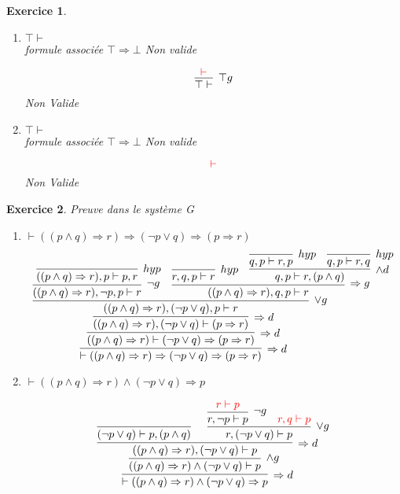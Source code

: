 \documentclass{article}
\theoremstyle{plain}
\newtheorem{exo}{Exercice}%
\begin{document}
\begin{exo}
\begin{enumerate}
        \[
            \infer[\bot g]{p, \bot \vdash}{}
        \]
        Valide

    \item $\top \vdash$\\
        formule associée $\top \Rightarrow \bot$ Non valide

        \[
            \infer[\top g]{\top \vdash}{\textcolor{red}{\vdash}}
        \]
        Non Valide

    \item $\top \vdash$\\
        formule associée $\top \Rightarrow \bot$ Non valide

        \[ \textcolor{red}{\vdash}\]
        Non Valide
\end{enumerate}
\end{exo}

\begin{exo} Preuve dans le système G
\begin{enumerate}
    \item  $\vdash ((p \wedge q) \Rightarrow r) \Rightarrow
                    (\neg p \vee q) \Rightarrow (p \Rightarrow r)$
    \[
        \infer[\Rightarrow d]{\vdash ((p \wedge q) \Rightarrow r) \Rightarrow
                (\neg p \vee q) \Rightarrow (p \Rightarrow r)}
        {
            \infer[\Rightarrow d]{((p \land q) \Rightarrow r) \vdash (\neg p \vee q)
                \Rightarrow (p \Rightarrow r)}
                {
                \infer[\Rightarrow d]
                {((p \land q) \Rightarrow r), (\neg p \vee q) \vdash (p \Rightarrow r)}
                {
                {
                \infer[\vee g]{((p \land q) \Rightarrow r), (\neg p \vee q), p
                \vdash r}{
                \infer[\neg g]{((p \land q) \Rightarrow r), \neg p, p \vdash r}
                {\infer[hyp]{((p \land q) \Rightarrow r), p \vdash p, r}{}}
                &
                \infer[\Rightarrow g]{((p \land q) \Rightarrow r), q, p \vdash r}
                {
                \infer[hyp]{r, q, p \vdash r}{}
                &
                \infer[\land d]{q, p \vdash r, (p \land q)}
                {
                \infer[hyp]{q, p \vdash r, p}{}
                &
                \infer[hyp]{q, p \vdash r, q}{}
                }
                }}}}}
        }
    \]

    \item $\vdash ((p \land q) \Rightarrow r) \land (\neg p \vee q)
                    \Rightarrow p$

    \[
        \infer[\Rightarrow d]{\vdash ((p \land q) \Rightarrow r) \land (\neg p \vee q)
        \Rightarrow p}
        {\infer[\land g]{((p \land q) \Rightarrow r) \land (\neg p \vee q) \vdash p}
        {\infer[\Rightarrow d]{((p \land q) \Rightarrow r), (\neg p \vee q) \vdash p}
        {
        \infer[]{(\neg p \vee q) \vdash p, (p \land q)}{}
        &
        \infer[\vee g]{r, (\neg p \vee q) \vdash p}
        {
        \infer[\neg g]{r, \neg p \vdash p}
        {\textcolor{red}{r \vdash p}}
        &
        \textcolor{red}{ r, q \vdash p}
        }}}}
    \]
\end{enumerate}
\end{exo}
\end{document}
